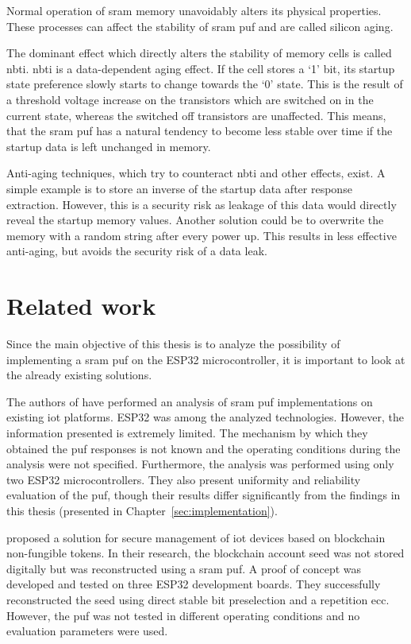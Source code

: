 Normal operation of \gls{sram} memory unavoidably alters its physical properties. These processes can affect the stability of \gls{sram} \gls{puf} and are called silicon aging.

The dominant effect which directly alters the stability of memory cells is called \gls{nbti}. \gls{nbti} is a data-dependent aging effect. If the cell stores a `1' bit, its startup state preference slowly starts to change towards the `0' state. This is the result of a threshold voltage increase on the transistors which are switched on in the current state, whereas the switched off transistors are unaffected. This means, that the \gls{sram} \gls{puf} has a natural tendency to become less stable over time if the startup data is left unchanged in memory.\cite{Roelke2018}

Anti-aging techniques, which try to counteract \gls{nbti} and other effects, exist. A simple example is to store an inverse of the startup data after response extraction. However, this is a security risk as leakage of this data would directly reveal the startup memory values. Another solution could be to overwrite the memory with a random string after every power up. This results in less effective anti-aging, but avoids the security risk of a data leak.\cite{Maes2014}

\section{Related work}

Since the main objective of this thesis is to analyze the possibility of implementing a \gls{sram} \gls{puf} on the ESP32 microcontroller, it is important to look at the already existing solutions.

The authors of \cite{Deutschmann2018} have performed an analysis of \gls{sram} \gls{puf} implementations on existing \gls{iot} platforms. ESP32 was among the analyzed technologies. However, the information presented is extremely limited. The mechanism by which they obtained the \gls{puf} responses is not known and the operating conditions during the analysis were not specified. Furthermore, the analysis was performed using only two ESP32 microcontrollers. They also present uniformity and reliability evaluation of the \gls{puf}, though their results differ significantly from the findings in this thesis (presented in Chapter~\ref{sec:implementation}).

\cite{Javier2020} proposed a solution for secure management of \gls{iot} devices based on blockchain non-fungible tokens. In their research, the blockchain account seed was not stored digitally but was reconstructed using a \gls{sram} \gls{puf}. A proof of concept was developed and tested on three ESP32 development boards. They successfully reconstructed the seed using direct stable bit preselection and a repetition \gls{ecc}. However, the \gls{puf} was not tested in different operating conditions and no evaluation parameters were used.

